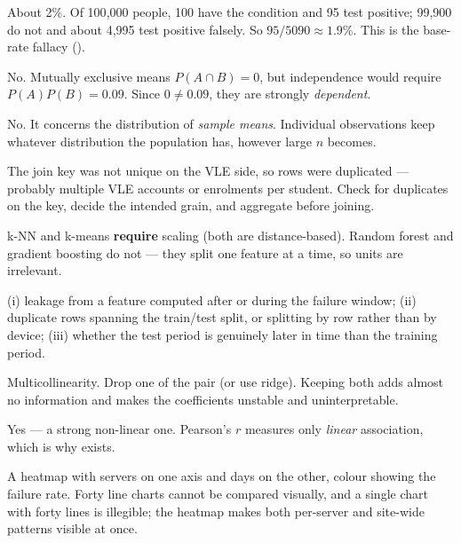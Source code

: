 \begin{ans}
  \item About 2\%. Of 100{,}000 people, 100 have the condition and 95 test
        positive; 99{,}900 do not and about 4{,}995 test positive falsely. So
        $95/5090 \approx 1.9\%$. This is the base-rate fallacy
        ().
  \item No. Mutually exclusive means $P(A\cap B)=0$, but independence would require
        $P(A)P(B)=0.09$. Since $0 \neq 0.09$, they are strongly \emph{dependent}.
  \item No. It concerns the distribution of \emph{sample means}. Individual
        observations keep whatever distribution the population has, however large
        $n$ becomes.
\end{ans}

\begin{ans}
  \item The join key was not unique on the VLE side, so rows were duplicated ---
        probably multiple VLE accounts or enrolments per student. Check for
        duplicates on the key, decide the intended grain, and aggregate before
        joining.
  \item k-NN and k-means \textbf{require} scaling (both are distance-based).
        Random forest and gradient boosting do not --- they split one feature at a
        time, so units are irrelevant.
  \item (i) leakage from a feature computed after or during the failure window;
        (ii) duplicate rows spanning the train/test split, or splitting by row
        rather than by device; (iii) whether the test period is genuinely later in
        time than the training period.
\end{ans}

\begin{ans}
  \item Multicollinearity. Drop one of the pair (or use ridge). Keeping both adds
        almost no information and makes the coefficients unstable and
        uninterpretable.
  \item Yes --- a strong non-linear one. Pearson's $r$ measures only \emph{linear}
        association, which is why  exists.
  \item A heatmap with servers on one axis and days on the other, colour showing
        the failure rate. Forty line charts cannot be compared visually, and a
        single chart with forty lines is illegible; the heatmap makes both
        per-server and site-wide patterns visible at once.
\end{ans}

